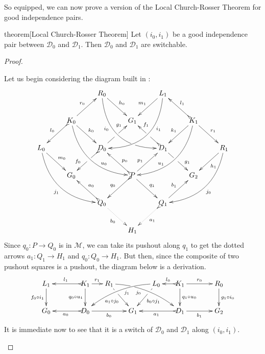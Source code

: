 \documentclass[a4paper,UKenglish,cleveref,pdftex, thm-restate,numberwithinsect]{lipics}
\newcommand{\dder}[1]{\mathscr{#1}}
\begin{document}
So equipped, we can now prove a version of the Local Church-Rosser Theorem for good independence pairs.
\begin{theoremEnd}[category=sec3]{theorem}[Local Church-Rosser Theorem]\label{thm:church} Let $(i_0, i_1)$ be a good independence pair between $\dder{D}_0$ and $\dder{D}_1$. Then $\dder{D}_0$ and $\dder{D}_1$ are switchable.
\end{theoremEnd}
\begin{proof}\begin{proofEnd}Let us begin considering the diagram built in :
		\[\xymatrix{&&R_0 \ar@/_1cm/[ddrr]_(.35){i_0}|(.7)\hole  \ar[dr]^{h_0}&& L_1\ar@/^1cm/[ddll]^(.35){i_1}  \ar[dl]_{m_1}\\&K_0\ar[dr]^{k_0}\ar@{>->}[dl]_{l_0} \ar@/_.8cm/[ddrr]^(.65){u_0}\ar[ur]^{r_0}&& G_1 && K_1 \ar@/^.8cm/[ddll]_(.65){u_1}\ar[dl]_{k_1}\ar@{>->}[lu]_{l_1} \ar[dr]^{r_1}\\L_0 \ar[dr]^{m_0} \ar@{>}@/_.8cm/[ddrr]_{j_1}&& D_0 \ar@{>->}[dl]|(.42)\hole_(.64){f_0}\ar[ur]|(.48)\hole^(.7){g_1}&&D_1 \ar[dr]|(.42)\hole^(.65){g_1} \ar@{>->}[ul]|(.48)\hole_(.7){f_1}&&R_1\ar@/^.8cm/[ddll]^{j_0}\ar[dl]^{h_1}\\&G_0 &&P\ar[dr]^{q_1} \ar@{>->}[dl]_{q_0}\ar[ur]^(.4){p_1}\ar@{>->}[ul]_(.4){p_0}&&G_2\\&&Q_0 \ar@{>->}@{>->}[ul]_{a_0} \ar@{.>}[dr]_{b_0} &&Q_1\ar[ur]^{b_1} \ar@{>.>}[dl]^{a_1} \\ &&&H_1 }\]
		Since $q_0\colon P\to Q_0$ is in $\mathcal{M}$, we can take its pushout along $q_1$ to get the dotted arrows $a_1\colon Q_1\to H_1$ and $q_0\colon Q_0\to H_1$. But then, since the composite of two pushout squares is a pushout, the diagram below is a derivation.
			\[\xymatrix@C=15pt{L_1 \ar[d]_{f_0 \circ i_1}&& K_1 \ar[d]_{q_0\circ u_1}\ar@{>->}[ll]_{l_1} \ar[r]^{r_1} & R_1 \ar@/^.35cm/[drrr]|(.3)\hole_(.4){j_0} \ar[dr]|(.3)\hole_{a_1\circ j_0} && L_0 \ar@/_.35cm/[dlll]^(.4){j_1} \ar[dl]|(.3)\hole^{b_0\circ j_1}& K_1 \ar[d]^{q_1\circ u_0}\ar@{>->}[l]_{l_0} \ar[rr]^{r_0} && R_0 \ar[d]^{g_1\circ i_0} \\G_0 && \ar@{>->}[ll]^{a_0} D_0 \ar[rr]_{b_0}&& G_1  && \ar@{>->}[ll]^{a_1} D_1 \ar[rr]_{b_1}&& G_2}\]
			It is immediate now to see that it is a switch of $\dder{D}_0$ and $\dder{D}_1$ along $(i_0, i_1)$.
		\end{proofEnd} 
\end{proof}
\end{document}
